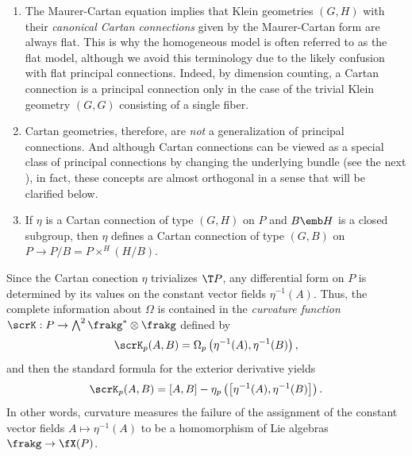 \begin{example}
    \begin{enumerate}
        \item The Maurer-Cartan equation implies that Klein geometries $(G,H)$ with their \emph{canonical Cartan connections} given by the Maurer-Cartan form are always flat. This is why the homogeneous model is often referred to as the flat model, although we avoid this terminology due to the likely confusion with flat principal connections. Indeed, by dimension counting, a Cartan connection is a principal connection only in the case of the trivial Klein geometry $(G,G)$ consisting of a single fiber.
        \item Cartan geometries, therefore, are \emph{not} a generalization of principal connections. And although Cartan connections can be viewed as a special class of principal connections by changing the underlying bundle (see the next \sect), in fact, these concepts are almost orthogonal in a sense that will be clarified below.
        \item If $\eta$ is a Cartan connection of type $(G,H)$ on $P$ and $B\emb H$ is a closed subgroup, then $\eta$ defines a Cartan connection of type $(G,B)$ on $P\to P\slash B= P\times^H (H\slash B)$.\label{xca V.3.6 Sharpe}
    \end{enumerate}
\end{example}


Since the Cartan conection $\eta$ trivializes $\T P$, any differential form on $P$ is determined by its values on the constant vector fields $\eta^{-1}(A)$. Thus, the complete information about $\Omega$ is contained in the \emph{curvature function} $\scrK:P\to \bigwedge^2\frakg^\ast\otimes\frakg$ defined by 
\[\scrK_p(A,B)=\Omega_p\left(\eta^{-1}(A),\eta^{-1}(B)\right),\]
and then the standard formula for the exterior derivative yields 
\[\scrK_p(A,B)=[A,B]-\eta_p\left(\left[\eta^{-1}(A),\eta^{-1}(B)\right]\right).\]
In other words, curvature measures the failure of the assignment of the constant vector fields $A\mapsto \eta^{-1}(A)$ to be a homomorphism of Lie algebras $\frakg\to \fX(P)$.

